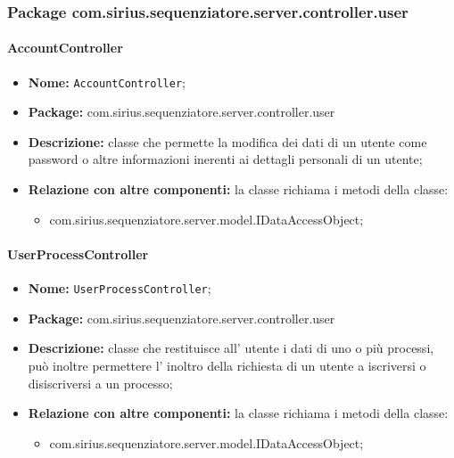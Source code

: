 \subsubsection{Package com.sirius.sequenziatore.server.controller.user}
\paragraph{AccountController}
	\begin{itemize}
		\item \textbf{Nome:} \texttt{AccountController};
		\item \textbf{Package:} com.sirius.sequenziatore.server.controller.user
		\item \textbf{Descrizione:} classe che permette la modifica dei dati di un utente come password o altre informazioni inerenti ai dettagli personali di un utente;
		\item \textbf{Relazione con altre componenti:} la classe richiama i metodi della classe:
		\begin{itemize}
			\item com.sirius.sequenziatore.server.model.IDataAccessObject;
		\end{itemize}
	\end{itemize}
\paragraph{UserProcessController}
	\begin{itemize}
		\item \textbf{Nome:} \texttt{UserProcessController};
		\item \textbf{Package:} com.sirius.sequenziatore.server.controller.user
		\item \textbf{Descrizione:} classe che restituisce all' utente i dati di uno o più processi, può inoltre permettere l' inoltro della richiesta di un utente a iscriversi o disiscriversi a un processo;
		\item \textbf{Relazione con altre componenti:} la classe richiama i metodi della classe:
		\begin{itemize}
			\item com.sirius.sequenziatore.server.model.IDataAccessObject;
		\end{itemize}
	\end{itemize}
